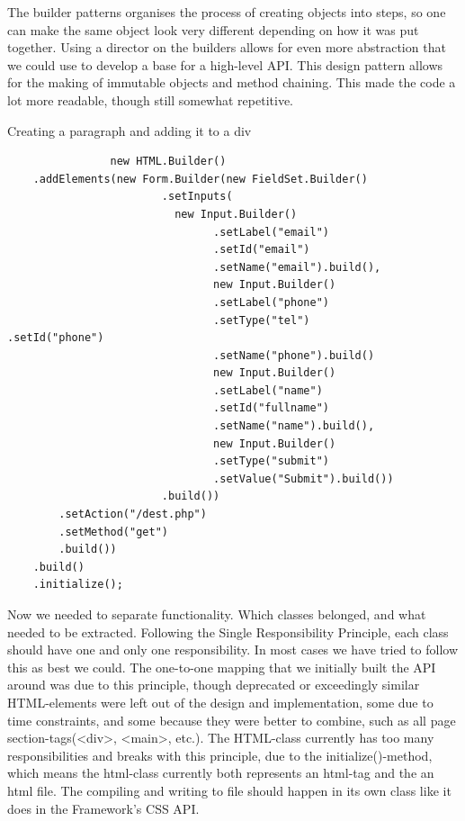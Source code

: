 \documentclass[12pt]{article}
\begin{document}
        The builder patterns organises the process of creating objects into steps, so one can make the same object look very different depending on how it was put together. Using a director on the builders allows for even more abstraction that we could use to develop a base for a high-level API.
        This design pattern allows for the making of immutable objects and method chaining. This made the code a lot more readable, though still somewhat repetitive.

        \begin{shaded}
            Creating a paragraph and adding it to a div
            \begin{lstlisting}
                new HTML.Builder()
    .addElements(new Form.Builder(new FieldSet.Builder()
                        .setInputs(
                          new Input.Builder()
                                .setLabel("email")
                                .setId("email")
                                .setName("email").build(),
                                new Input.Builder()
                                .setLabel("phone")
                                .setType("tel")                                    					 .setId("phone")
                                .setName("phone").build()
                                new Input.Builder()
                                .setLabel("name")
                                .setId("fullname")
                                .setName("name").build(),
                                new Input.Builder()
                                .setType("submit")
                                .setValue("Submit").build())
                        .build())
        .setAction("/dest.php")
        .setMethod("get")
        .build())
    .build()
    .initialize();

            \end{lstlisting}
        \end{shaded}
        
        Now we needed to separate functionality. Which classes belonged, and what needed to be extracted. Following the Single Responsibility Principle, each class should have one and only one responsibility. In most cases we have tried to follow this as best we could. The one-to-one mapping that we initially built the API around was due to this principle, though deprecated or exceedingly similar HTML-elements were left out of the design and implementation, some due to time constraints, and some because they were better to combine, such as all page section-tags(<div>, <main>, etc.). The HTML-class currently has too many responsibilities and breaks with this principle, due to the initialize()-method, which means the html-class currently both represents an html-tag and the an html file. The compiling and writing to file should happen in its own class like it does in the Framework’s CSS API.
\end{document}
